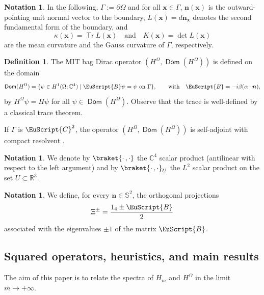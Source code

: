 \documentclass[10pt]{amsart}
\let\mathcal \EuScript
\newcommand{\cB}{\mathcal{B}}
\newcommand{\cC}{\mathcal{C}}
\DeclareMathOperator{\Tr}{\mathsf{Tr}}
\let\sep\mid
\theoremstyle{plain}
\theoremstyle{definition}
\newtheorem{notation}[theorem]{Notation}
\newtheorem{definition}[theorem]{Definition}
\newcommand{\RR}{\mathbb{R}}
\newcommand{\CC}{\mathbb{C}}
\newcommand{\bn}{{\boldsymbol n}}
\newcommand{\bx}{{\boldsymbol x}}
\let\pa\partial
\DeclareMathOperator{\Dom}{\mathsf{Dom}}
\begin{document}
\begin{notation}\label{not.def1}
In the following, $\Gamma := \pa \Omega$ and for all $\bx\in\Gamma$, $\bn(\bx)$ is the outward-pointing unit normal vector to the boundary, $L(\bx)=d\bn_{\bx}$ denotes the second fundamental form of the boundary, and
\begin{equation*}
\kappa(\bx)=\Tr L(\bx) \quad\text{and}\quad K(\bx) = \det L(\bx)
\end{equation*}
are the mean curvature and the Gauss curvature of $\Gamma$, respectively.
\end{notation}

\begin{definition}\label{def.MIT}
The MIT bag Dirac operator $(H^\Omega,\Dom(H^\Omega))$ is defined on the domain
\[
\Dom(H^\Omega) = \{\psi\in H^1(\Omega;\mathbb{C}^4)\sep\cB\psi = \psi~\text{on}~\Gamma\},\qquad\mbox{with}\quad\cB=-i\beta(\alpha\cdot \bn),
\]
by $H^\Omega\psi=H\psi$ for all $\psi\in\Dom(H^\Omega)$. Observe that the trace is well-defined by a classical trace theorem.

If $\Gamma$ is $\cC^2$, the operator $(H^\Omega,\Dom(H^\Omega))$ is self-adjoint with compact resolvent \cite{OBV17,ALR17SA,booss2009calderon,benguria2016spectral,BB12}.
\end{definition}
\begin{notation}
We denote by $\braket{\cdot\,,\cdot}$ the $\CC^4$ scalar product (antilinear with respect to the left argument) and by $\braket{\cdot\,,\cdot}_{U}$ the $L^2$ scalar product on the set $U\subset\RR^3$.
\end{notation}

\begin{notation}
We define, for every $\bn\in \mathbb{S}^2$, the orthogonal projections
\begin{equation}\label{eq:boundary_projections}
\Xi^\pm = \frac{1_4\pm\cB}{2}
\end{equation}
associated with the eigenvalues $\pm1$ of the matrix $\cB$.
\end{notation}

\subsection{Squared operators, heuristics, and main results}
The aim of this paper is to relate the spectra of $H_{m}$ and $H^\Omega$ in the limit $m\to+\infty$.
\end{document}
